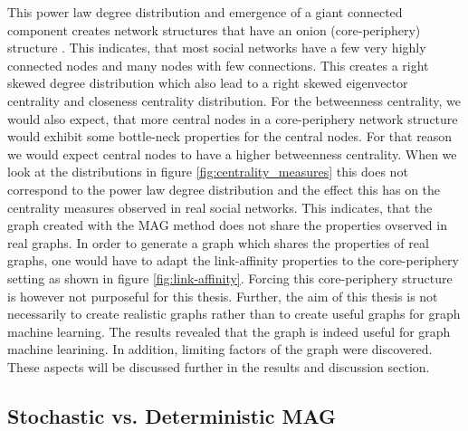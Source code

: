   \noindent This power law degree distribution and emergence of a giant
  connected component creates network structures that have an onion
  (core-periphery) structure \citep[p. 121]{kim2012multiplicative}. This
  indicates, that most social networks have a few very highly connected nodes
  and many nodes with few connections. This creates a right skewed degree 
  distribution which also lead to a right skewed eigenvector centrality and
  closeness centrality distribution. For the betweenness centrality, we would
  also expect, that more central nodes in a core-periphery network structure
  would exhibit some bottle-neck properties for the central nodes. For that
  reason we would expect central nodes to have a higher betweenness centrality.
  When we look at the distributions in figure \ref{fig:centrality_measures}
  this does not correspond to the power law degree distribution and the effect
  this has on the centrality measures observed in real social networks. This
  indicates, that the graph created with the MAG method does not share the
  properties ovserved in real graphs. In order to generate a graph which
  shares the properties of real graphs, one would have to adapt the 
  link-affinity properties to the core-periphery setting as shown in figure
  \ref{fig:link-affinity}. Forcing this core-periphery structure is however not
  purposeful for this thesis. Further, the aim of this thesis is not
  necessarily to create realistic graphs rather than to create useful graphs 
  for graph machine learning. The results revealed that the graph is indeed
  useful for graph machine learining. In addition, limiting factors of the
  graph were discovered. These aspects will be discussed further in the results
  and discussion section. 


  \subsection{Stochastic vs. Deterministic MAG}

